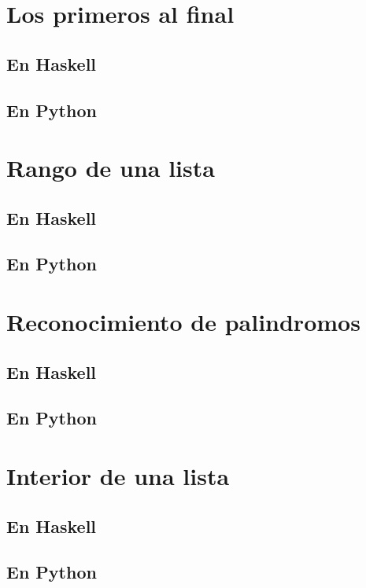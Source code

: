 \documentclass[a4paper,12pt,twoside]{book}
\begin{document}
\section{Los primeros al final}
\subsection*{En Haskell}
\subsection*{En Python}

\section{Rango de una lista}
\subsection*{En Haskell}
\subsection*{En Python}

\section{Reconocimiento de palindromos}
\subsection*{En Haskell}
\subsection*{En Python}

\section{Interior de una lista}
\subsection*{En Haskell}
\subsection*{En Python}
\end{document}
